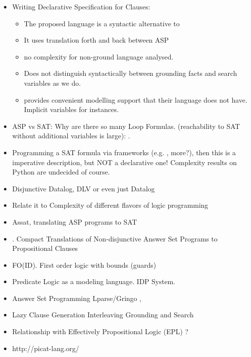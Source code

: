 \documentclass[runningheads]{llncs}
\begin{document}
\begin{itemize}
    \item Writing Declarative Specification for Clauses: \cite{Gebser16} 
        \begin{itemize}
            \item The proposed language is a syntactic alternative to \bcore
            \item It uses translation forth and back between ASP
            \item no complexity for non-ground language analysed. 
            \item Does not distinguish syntactically between grounding facts and search variables as we do. 
            \item \bnice provides convenient modelling support that their language does not have. Implicit variables for instances. 
        \end{itemize}
    \item ASP vs SAT: Why are there so many Loop Formulas. (reachability to SAT without additional variables is large): \cite{Lifschitz04} .
    \item Programming a SAT formula via frameworks (e.g. \cite{Pysat18},
        more?), then this is a imperative description, but NOT a declarative
        one! Complexity results on Python are undecided of course. 
    \item Disjunctive Datalog, DLV \cite{Eiter97} or even just Datalog \cite{Gottlob89}
    \item Relate it to Complexity of different flavors of logic programming \cite{Gottlob01}
    \item Assat, translating ASP programs to SAT \cite{Lin04}
    \item \cite{Janhunen11}. Compact Translations of Non-disjunctive Answer Set
        Programs to Propositional Clauses
    \item FO(ID). First order logic with bounds (guards) \cite{Wittocx10}
    \item Predicate Logic as a modeling language. IDP System. \cite{Cat18}
    \item Answer Set Programming Lparse/Gringo \cite{Gebser15}, \cite{Ferraris05}
    \item Lazy Clause Generation Interleaving Grounding and Search \cite{Cat15}
    \item Relationship with Effectively Propositional Logic (EPL) \cite{Moura08}? 
    \item http://picat-lang.org/
\end{itemize}
 


\end{document}
